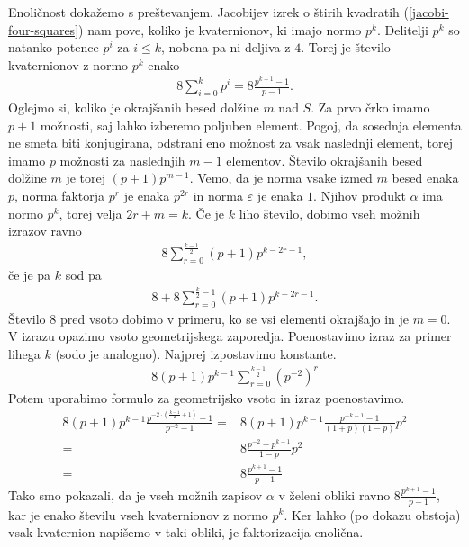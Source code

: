 \begin{dokaz}
    Enoličnost dokažemo s preštevanjem. Jacobijev izrek o štirih kvadratih (\ref{jacobi-four-squares}) nam pove, koliko je kvaternionov, ki imajo normo \(p^k\). Delitelji \(p^k\) so natanko potence \(p^i\) za \(i\leq k\), nobena pa ni deljiva z \(4\). Torej je število kvaternionov z normo \(p^k\) enako 
    \begin{align*}
        8\sum_{i=0}^k p^i = 8\frac{p^{k+1}-1}{p-1}.
    \end{align*}
    Oglejmo si, koliko je okrajšanih besed dolžine \(m\) nad \(S\). Za prvo črko imamo \(p+1\) možnosti, saj lahko izberemo poljuben element. Pogoj, da sosednja elementa ne smeta biti konjugirana, odstrani eno možnost za vsak naslednji element, torej imamo \(p\) možnosti za naslednjih \(m-1\) elementov. Število okrajšanih besed dolžine \(m\) je torej \((p+1)p^{m-1}\). Vemo, da je norma vsake izmed \(m\) besed enaka \(p\), norma faktorja \(p^r\) je enaka \(p^{2r}\) in norma \(\varepsilon\) je enaka \(1\). Njihov produkt \(\alpha\) ima normo \(p^k\), torej velja \(2r+m=k\). Če je \(k\) liho število, dobimo vseh možnih izrazov ravno
    \begin{align*}
        8\sum_{r=0}^{\frac{k-1}{2}} (p+1)p^{k-2r-1},
    \end{align*} 
    če je pa \(k\) sod pa
    \begin{align*}
        8+8\sum_{r=0}^{\frac{k}{2}-1} (p+1)p^{k-2r-1}.
    \end{align*}
    Število \(8\) pred vsoto dobimo v primeru, ko se vsi elementi okrajšajo in je \(m=0\). V izrazu opazimo vsoto geometrijskega zaporedja. Poenostavimo izraz za primer lihega \(k\) (sodo je analogno). Najprej izpostavimo konstante.
    \begin{align*}
        8(p+1)p^{k-1}\sum_{r=0}^{\frac{k-1}{2}} \left(p^{-2}\right)^r
    \end{align*}
    Potem uporabimo formulo za geometrijsko vsoto in izraz poenostavimo.
    \begin{align*}
        8(p+1)p^{k-1} \frac{p^{-2\cdot \left(\frac{k-1}{2}+1\right)}-1}{p^{-2}-1}
        =& 8(p+1)p^{k-1} \frac{p^{-k-1}-1}{(1+p)(1-p)} p^2\\
        =& 8\frac{p^{-2} - p^{k-1}}{1-p} p^2\\
        =& 8\frac{p^{k+1} - 1}{p-1}
    \end{align*}
    Tako smo pokazali, da je vseh možnih zapisov \(\alpha\) v želeni obliki ravno \(8\frac{p^{k+1}-1}{p-1}\), kar je enako številu vseh kvaternionov z normo \(p^k\). Ker lahko (po dokazu obstoja) vsak kvaternion napišemo v taki obliki, je faktorizacija enolična.
\end{dokaz}
